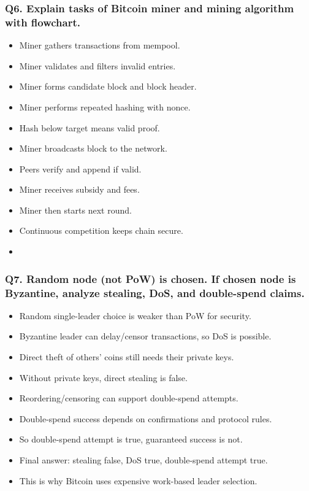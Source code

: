 \documentclass[12pt,a4paper]{article}
\begin{document}
\subsubsection*{Q6. Explain tasks of Bitcoin miner and mining algorithm with flowchart.}
\begin{itemize}
\item Miner gathers transactions from mempool.
\item Miner validates and filters invalid entries.
\item Miner forms candidate block and block header.
\item Miner performs repeated hashing with nonce.
\item Hash below target means valid proof.
\item Miner broadcasts block to the network.
\item Peers verify and append if valid.
\item Miner receives subsidy and fees.
\item Miner then starts next round.
\item Continuous competition keeps chain secure.
\item[]
\vspace{0.25em}
\noindent{}
\end{itemize}

\subsubsection*{Q7. Random node (not PoW) is chosen. If chosen node is Byzantine, analyze stealing, DoS, and double-spend claims.}
\begin{itemize}
\item Random single-leader choice is weaker than PoW for security.
\item Byzantine leader can delay/censor transactions, so DoS is possible.
\item Direct theft of others' coins still needs their private keys.
\item Without private keys, direct stealing is false.
\item Reordering/censoring can support double-spend attempts.
\item Double-spend success depends on confirmations and protocol rules.
\item So double-spend attempt is true, guaranteed success is not.
\item Final answer: stealing false, DoS true, double-spend attempt true.
\item This is why Bitcoin uses expensive work-based leader selection.
\end{itemize}
\end{document}
